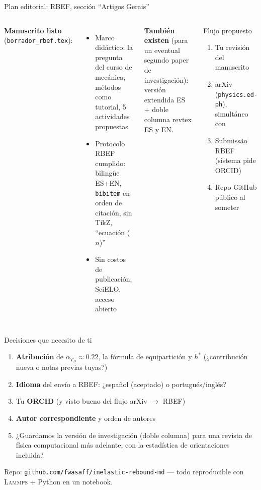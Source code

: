 \documentclass[11pt,aspectratio=169]{beamer}
\newcommand{\lammps}{\textsc{Lammps}}
\begin{document}
\begin{frame}{Plan editorial: RBEF, sección ``Artigos Gerais''}
\begin{columns}[T]
\textbf{Manuscrito listo} (\texttt{borrador\_rbef.tex}):
\begin{itemize}
    \item \small Marco didáctico: la pregunta del curso de mecánica,
    métodos como tutorial, 5 actividades propuestas
    \item \small Protocolo RBEF cumplido: bilingüe ES+EN, \texttt{bibitem}
    en orden de citación, sin TikZ, ``ecuación ($n$)''
    \item \small Sin costos de publicación; SciELO, acceso abierto
\end{itemize}
\medskip
\textbf{También existen} (para un eventual segundo paper de
investigación): versión extendida ES + doble columna revtex ES y EN.
\begin{block}{\small Flujo propuesto}
\small
\begin{enumerate}
    \item Tu revisión del manuscrito
    \item arXiv (\texttt{physics.ed-ph}), simultáneo con
    \item Submissão RBEF (sistema pide ORCID)
    \item Repo GitHub público al someter
\end{enumerate}
\end{block}
\end{columns}
\end{frame}

\begin{frame}{Decisiones que necesito de ti}
\begin{enumerate}
    \item \textbf{Atribución} de $\alpha_{T_B}\approx0.22$, la fórmula de
    equipartición y $h^*$ (¿contribución nueva o notas previas tuyas?)
    \item \textbf{Idioma} del envío a RBEF: ¿español (aceptado) o
    portugués/inglés?
    \item Tu \textbf{ORCID} (y visto bueno del flujo arXiv $\to$ RBEF)
    \item \textbf{Autor correspondiente} y orden de autores
    \item ¿Guardamos la versión de investigación (doble columna) para una
    revista de física computacional más adelante, con la estadística de
    orientaciones incluida?
\end{enumerate}
\bigskip
\centering
\footnotesize Repo: \texttt{github.com/fwasaff/inelastic-rebound-md}
--- todo reproducible con \lammps{} + Python en un notebook.
\end{frame}
\end{document}
